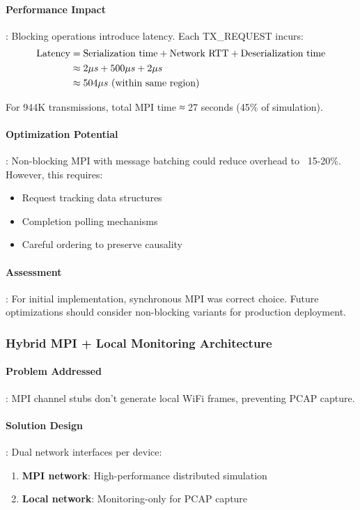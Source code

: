 \paragraph{Performance Impact}:
Blocking operations introduce latency. Each TX\_REQUEST incurs:
\begin{align}
\text{Latency} &= \text{Serialization time} + \text{Network RTT} + \text{Deserialization time} \notag \\
&\approx 2 \mu s + 500 \mu s + 2 \mu s \notag \\
&\approx 504 \mu s \text{ (within same region)}
\end{align}

For 944K transmissions, total MPI time ≈ 27 seconds (45\% of simulation).

\paragraph{Optimization Potential}:
Non-blocking MPI with message batching could reduce overhead to ~15-20\%. However, this requires:
\begin{itemize}
    \item Request tracking data structures
    \item Completion polling mechanisms
    \item Careful ordering to preserve causality
\end{itemize}

\paragraph{Assessment}:
For initial implementation, synchronous MPI was correct choice. Future optimizations should consider non-blocking variants for production deployment.

\subsubsection{Hybrid MPI + Local Monitoring Architecture}

\paragraph{Problem Addressed}:
MPI channel stubs don't generate local WiFi frames, preventing PCAP capture.

\paragraph{Solution Design}:
Dual network interfaces per device:
\begin{enumerate}
    \item \textbf{MPI network}: High-performance distributed simulation
    \item \textbf{Local network}: Monitoring-only for PCAP capture
\end{enumerate}

